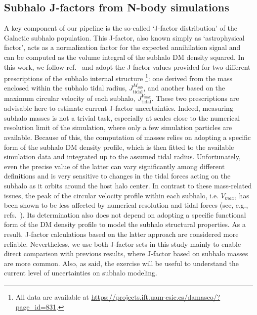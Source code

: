 \documentclass[12pt, a4paper]{article}
\newcommand{\Msub}{M_\textrm{sub}}
\newcommand{\Vmax}{V_\textrm{max}}
\begin{document}
\subsection{Subhalo J-factors from N-body simulations}
\label{sec:sim-jfactor}
A key component of our pipeline is the so-called ‘J-factor distribution’ of the Galactic subhalo population. This J-factor, also known simply as ‘astrophysical factor’, acts as a normalization factor for the expected annihilation signal and can be computed as the volume integral of the subhalo DM density squared. In this work, we follow ref.~\cite{2024MNRAS.530.2496A} and adopt the J-factor values provided for two different prescriptions of the subhalo internal structure%
\footnote{All data are available at \url{https://projects.ift.uam-csic.es/damasco/?page_id=831}.}: one derived from the mass enclosed within the subhalo tidal radius, $J_\textrm{tidal}^{\Msub}$, and another based on the maximum circular velocity of each subhalo, $J_\textrm{tidal}^{\Vmax}$. 
These two prescriptions are advisable here to estimate current J-factor uncertainties. 
Indeed, measuring subhalo masses is not a trivial task, especially at scales close to the numerical resolution limit of the simulation, where only a few simulation particles are available. Because of this, the computation of masses relies on adopting a specific form of the subhalo DM density profile, which is then fitted to the available simulation data and integrated up to the assumed tidal radius. Unfortunately, even the precise value of the latter can vary significantly among different definitions and is very sensitive to changes in the tidal forces acting on the subhalo as it orbits around the host halo center. In contrast to these mass-related issues, the peak of the circular velocity profile within each subhalo, i.e. $V_{max}$, has been shown to be less affected by numerical resolution and tidal forces (see, e.g., refs.~\cite{2024MNRAS.530.2496A,2025arXiv250601152A}). Its determination also does not depend on adopting a specific functional form of the DM density profile to model the subhalo structural properties. As a result, J-factor calculations based on the latter approach are considered more reliable. Nevertheless, we use both J-factor sets in this study mainly to enable direct comparison with previous results, where J-factor based on subhalo masses are more common. Also, as said, the exercise will  be useful to understand the current level of uncertainties on subhalo modeling.
\end{document}

